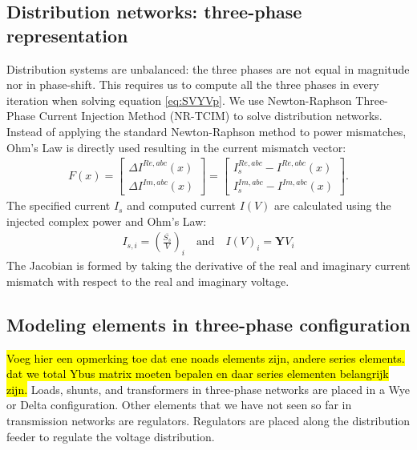 \documentclass[10pt,journal]{article}
\begin{document}
\subsection{Distribution networks: three-phase representation}
Distribution systems are unbalanced: the three phases are not equal in magnitude nor in phase-shift. This requires us to compute all the three phases in every iteration when solving equation \eqref{eq:SVYVp}. We use Newton-Raphson Three-Phase Current Injection Method (NR-TCIM) \cite{Garcia2000} to solve distribution networks. Instead of applying the standard Newton-Raphson method to power mismatches, Ohm's Law  is directly used resulting in the current mismatch vector: 
\begin{align}
     {F}({x})=\begin{bmatrix}
                \Delta {I}^{Re,abc}({x})\\ 
                \Delta {I}^{Im,abc}({x}) 
               \end{bmatrix}  = \begin{bmatrix}
   {I}_s^{Re,abc} - {I}^{Re,abc}({x}) \\
   {I}_s^{Im,abc} - {I}^{Im,abc}({x})
               \end{bmatrix}.
    \label{eq:curmism}
\end{align}
The specified current ${I_s}$ and computed current ${I}\left({V}\right)$ are calculated using the injected complex power and Ohm's Law: 
\begin{align}
    {I_{s,i}} = \left(\frac{\overline{S_s}}{V}\right)_i\quad\mbox{and}\quad I(V)_i = \mathbf{Y}V_i 
\end{align}
The Jacobian is formed by taking the derivative of the real and imaginary current mismatch with respect to the real and imaginary voltage.
\subsection{Modeling elements in three-phase configuration}\hl{Voeg hier een opmerking toe dat ene noads elements zijn, andere series elements. dat we total Ybus matrix moeten bepalen en daar series elementen belangrijk zijn.}
Loads, shunts, and transformers in three-phase networks are placed in a Wye or Delta configuration. Other elements that we have not seen so far in transmission networks are regulators. Regulators are placed along the distribution feeder to regulate the voltage distribution. 
\end{document}
